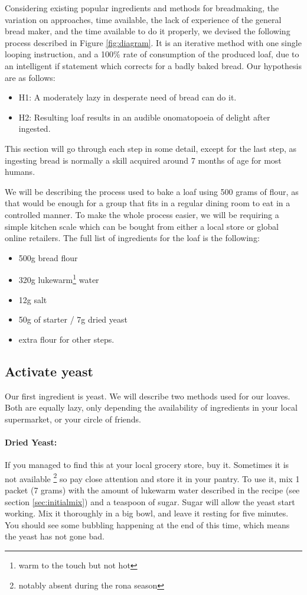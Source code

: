 \documentclass[acmtog, nonacm]{acmart}
\begin{document}
Considering existing popular ingredients and methods for breadmaking, the variation on approaches, time available, the lack of experience of the general bread maker, and the time available to do it properly, we devised the following process described in Figure \ref{fig:diagram}. 
It is an iterative method with one single looping instruction, and a 100\% rate of consumption of the produced loaf, due to an intelligent if statement which corrects for a badly baked bread. 
Our hypothesis are as follows:
\begin{itemize}
    \item H1: A moderately lazy in desperate need of bread can do it.
    \item H2: Resulting loaf results in an audible onomatopoeia of delight after ingested.
\end{itemize}

This section will go through each step in some detail, except for the last step, as ingesting bread is normally a skill acquired around 7 months of age for most humans. 

We will be describing the process used to bake a loaf using 500 grams of flour, as that would be enough for a group that fits in a regular dining room to eat in a controlled manner.
To make the whole process easier, we will be requiring a simple kitchen scale which can be bought from either a local store or global online retailers. 
The full list of ingredients for the loaf is the following:

\begin{itemize}
    \item 500g bread flour
    \item 320g lukewarm\footnote{warm to the touch but not hot} water
    \item 12g salt
    \item 50g of starter / 7g dried yeast
    \item extra flour for other steps. 
\end{itemize}

\subsection{Activate yeast}
Our first ingredient is yeast. 
We will describe two methods used for our loaves.
Both are equally lazy, only depending the availability of ingredients in your local supermarket, or your circle of friends.

\paragraph{Dried Yeast:} If you managed to find this at your local grocery store, buy it.
Sometimes it is not available \footnote{notably absent during the rona season} so pay close attention and store it in your pantry. 
To use it, mix 1 packet (7 grams) with the amount of lukewarm water described in the recipe (see section \ref{sec:initialmix}) and a teaspoon of sugar.
Sugar will allow the yeast start working.
Mix it thoroughly in a big bowl, and leave it resting for five minutes. 
You should see some bubbling happening at the end of this time, which means the yeast has not gone bad.
\end{document}
